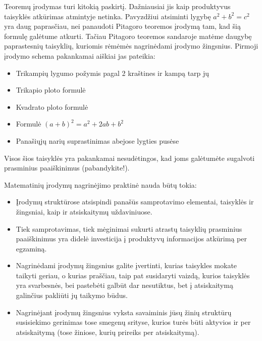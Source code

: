 \documentclass{article}
\begin{document}
Teoremų įrodymas turi kitokią paskirtį. Dažniausiai jis kaip produktyvus taisyklės atkūrimas atmintyje netinka. Pavyzdžiui atsiminti lygybę $a^2+b^2=c^2$ yra daug paprasčiau, nei panaudoti Pitagoro teoremos įrodymą tam, kad šią formulę galėtume atkurti. Tačiau Pitagoro teoremos sandaroje matėme daugybę paprastesnių taisyklių, kuriomis rėmėmės nagrinėdami įrodymo žingsnius. Pirmoji įrodymo schema pakankamai aiškiai jas pateikia:
\begin{itemize}
\item Trikampių lygumo požymis pagal 2 kraštines ir kampą tarp jų
\item Trikapio ploto formulė
\item Kvadrato ploto formulė
\item Formulė $(a+b)^2=a^2+2ab+b^2$
\item Panašiųjų narių suprastinimas abejose lygties pusėse
\end{itemize}
Visos šios taisyklės yra pakankamai nesudėtingos, kad joms galėtumėte sugalvoti prasminius paaiškinimus (pabandykite!). 

Matematinių įrodymų nagrinėjimo praktinė nauda būtų tokia:
\begin{itemize}
\item Įrodymų struktūrose atsispindi panašūs samprotavimo elementai, taisyklės ir žingsniai, kaip ir atsiskaitymų uždaviniuose.
\item Tiek samprotavimas, tiek mėginimai sukurti atrastų taisyklių prasminius paaiškinimus yra didelė investicija į produktyvų informacijos atkūrimą per egzaminą.
\item Nagrinėdami įrodymų žingsnius galite įvertinti, kurias taisykles mokate taikyti geriau, o kurias praščiau, taip pat susidaryti vaizdą, kurios taisyklės yra svarbesnės, bei pastebėti galbūt dar nesutiktus, bet į atsiskaitymą galinčius pakliūti jų taikymo būdus.
\item Nagrinėjant įrodymų žingsnius vyksta savaiminis jūsų žinių struktūrų susisiekimo gerinimas tose smegenų srityse, kurios turės būti aktyvios ir per atsiskaitymą (tose žiniose, kurių prireiks per atsiskaitymą).
\end{itemize}
\end{document}
